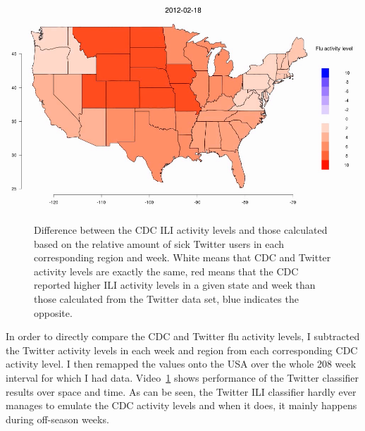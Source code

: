 \documentclass[11pt, a4paper,twoside]{report}\usepackage[]{graphicx}\usepackage[]{color}
\begin{document}
\vspace{-0.6in}
\begin{center}
\href{run:vids/3_cdc_twitter_diff_user_regio.avi}{\includegraphics[width=0.9\linewidth]{vids/3_cdc_twitter_diff_user_regio.png}}
\end{center}
\vspace{-0.2in}
\begin{figure}[htbp!]
\centering
  \caption{Difference between the CDC ILI activity levels and those calculated based on the relative amount of sick Twitter users in each corresponding region and week. White means that CDC and Twitter activity levels are exactly the same, red means that the CDC reported higher ILI activity levels in a given state and week than those calculated from the Twitter data set, blue indicates the opposite.}
    \label{fig:cdc_twitter_comp_regio}
\end{figure}

In order to directly compare the CDC and Twitter flu activity levels, I subtracted the Twitter activity levels in each week and region from each corresponding CDC activity level. I then remapped the values onto the USA over the whole 208 week interval for which I had data. Video~\ref{fig:cdc_twitter_comp_regio} shows performance of the Twitter classifier results over space and time. As can be seen, the Twitter ILI classifier hardly ever manages to emulate the CDC activity levels and when it does, it mainly happens during off-season weeks. 
\end{document}
